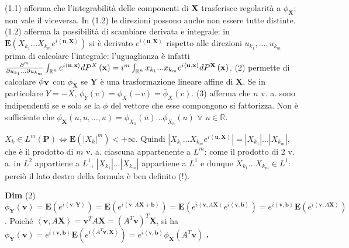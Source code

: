 \documentclass{article}
\begin{document}
(1.1) afferma che l'integrabilit\`{a} delle componenti di $\mathbf{X}$
trasferisce regolarit\`{a} a $\phi _{\mathbf{X}}$; non vale il viceversa. In
(1.2) le direzioni possono anche non essere tutte distinte. (1.2) afferma la
possibilit\`{a} di scambiare derivata e integrale: in $\mathbf{E}\left(
X_{k_{1}}...X_{k_{m}}e^{i\left\langle \mathbf{u,X}\right\rangle }\right) $
si \`{e} derivato $e^{i\left\langle \mathbf{u,X}\right\rangle }$ rispetto
alle direzioni $u_{k_{1}},...,u_{k_{m}}$ prima di calcolare l'integrale:
l'uguaglianza \`{e} infatti $\frac{\partial ^{m}}{\partial
u_{k_{1}}...\partial u_{k_{m}}}\int_{%
\mathbb{R}
^{n}}e^{i\left\langle \mathbf{u,x}\right\rangle }dP^{X}\left( \mathbf{x}%
\right) =i^{m}\int_{%
\mathbb{R}
^{n}}x_{k_{1}}...x_{k_{m}}e^{i\left\langle \mathbf{u,x}\right\rangle }dP^{%
\mathbf{X}}\left( \mathbf{x}\right) $. (2) permette di calcolare $\phi _{%
\mathbf{Y}}$ con $\phi _{\mathbf{X}}$ se $\mathbf{Y}$ \`{e} una
trasformazione lineare affine di $\mathbf{X}$. Se in particolare $Y=-X$, $%
\phi _{Y}\left( v\right) =\phi _{X}\left( -v\right) =\bar{\phi}_{X}\left(
v\right) $. (3) afferma che $n$ v. a. sono indipendenti se e solo se la $%
\phi $ del vettore che esse compongono si fattorizza. Non \`{e} sufficiente
che $\phi _{\mathbf{X}}\left( u,u,...,u\right) =\phi _{X_{1}}\left( u\right)
...\phi _{X_{n}}\left( u\right) $ $\forall $ $u\in 
\mathbb{R}
$.

$X_{k}\in L^{m}\left( \mathbf{P}\right) \Longleftrightarrow \mathbf{E}\left(
\left\vert X_{k}\right\vert ^{m}\right) <+\infty $. Quindi $\left\vert
X_{k_{1}}...X_{k_{m}}e^{i\left\langle \mathbf{u,X}\right\rangle }\right\vert
=\left\vert X_{k_{1}}\right\vert ...\left\vert X_{k_{m}}\right\vert $, che 
\`{e} il prodotto di $m$ v. a. ciascuna appartenente a $L^{m}$: come il
prodotto di $2$ v. a. in $L^{2}$ appartiene a $L^{1}$, $\left\vert
X_{k_{1}}\right\vert ...\left\vert X_{k_{m}}\right\vert $ appartiene a $%
L^{1} $ e dunque $X_{k_{1}}...X_{k_{m}}\in L^{1}$: perci\`{o} il lato destro
della formula \`{e} ben definito (!).

\textbf{Dim} (2) $\phi _{\mathbf{Y}}\left( \mathbf{v}\right) =\mathbf{E}%
\left( e^{i\left\langle \mathbf{v,Y}\right\rangle }\right) =\mathbf{E}\left(
e^{i\left\langle \mathbf{v,}A\mathbf{X+b}\right\rangle }\right) =\mathbf{E}%
\left( e^{i\left\langle \mathbf{v,}A\mathbf{X}\right\rangle
}e^{i\left\langle \mathbf{v,b}\right\rangle }\right) =e^{i\left\langle 
\mathbf{v,b}\right\rangle }\mathbf{E}\left( e^{i\left\langle \mathbf{v,}A%
\mathbf{X}\right\rangle }\right) $. Poich\'{e} $\left\langle \mathbf{v},A%
\mathbf{X}\right\rangle =\mathbf{v}^{T}A\mathbf{X=}\left( A^{T}\mathbf{v}%
\right) ^{T}\mathbf{X}$, si ha $\phi _{\mathbf{Y}}\left( \mathbf{v}\right)
=e^{i\left\langle \mathbf{v,b}\right\rangle }\mathbf{E}\left(
e^{i\left\langle A^{T}\mathbf{v,X}\right\rangle }\right) =e^{i\left\langle 
\mathbf{v,b}\right\rangle }\phi _{\mathbf{X}}\left( A^{T}\mathbf{v}\right) $%
\textbf{. }
\end{document}
